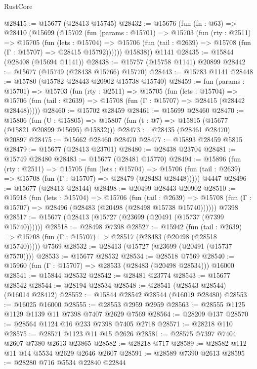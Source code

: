 \begin{lexlean}{RustCore}
\begin{coremodule}
@28415 := @15677 (@28413 @15745)
@28432 := @15676
    (fun (fn : @63) =>
    @28410
      (@15699
        (@15702
          (fun (params : @15701) =>
          @15703
            (fun (rty : @2511) =>
            @15705
              (fun (lets : @15704) =>
              @15706 (fun (tail : @2639) => @15708 (fun (Γ : @15707) => @28415 @15792))))))
        @15838))
    @1141
@28435 := @15844 (@28408 (@15694 @1141))
@28438 := @15757 (@15758 @1141) @20899
@28442 := @15677 (@15749 (@28438 @15766) @15770)
@28443 := @15783 @1141
@28448 := @15780 (@15782 @28443 @20902 @15738 @15740)
@28459 := fun (params : @15701) =>
  @15703
    (fun (rty : @2511) =>
    @15705
      (fun (lets : @15704) =>
      @15706 (fun (tail : @2639) => @15708 (fun (Γ : @15707) => @28415 (@28442 @28448)))))
@28460 := @15702 @28459
@28461 := @15699 @28460
@28470 := @15806
    (fun (U : @15805) => @15807 (fun (t : @7) => @15815 (@15677 (@15821 @20899 @15695) @15832)))
@28473 := @28435 (@28461 @28470) @20897
@28475 := @15662 @28460 @28470
@28477 := @15893 @28459 @5815
@28479 := @15677 (@28413 @23701)
@28480 := @28438 @23704
@28481 := @15749 @28480
@28483 := @15677 (@28481 @15770)
@28494 := @15896
    (fun (rty : @2511) =>
    @15705
      (fun (lets : @15704) =>
      @15706 (fun (tail : @2639) => @15708 (fun (Γ : @15707) => @28479 (@28483 @28448)))))
    @4447
@28496 := @15677 (@28413 @28144)
@28498 := @20499 @28443 @20902
@28510 := @15918
    (fun (lets : @15704) =>
    @15706
      (fun (tail : @2639) =>
      @15708 (fun (Γ : @15707) => @28496 (@28483 (@20498 (@28498 @15738 @15740))))))
    @7398
@28517 := @15677 (@28413 (@15727 (@23699 (@20491 (@15737 (@7399 @15740))))))
@28518 := @28498 @7398
@28527 := @15942
    (fun (tail : @2639) => @15708 (fun (Γ : @15707) => @28517 (@28483 (@20498 (@28518 @15740)))))
    @7569
@28532 := @28413 (@15727 (@23699 (@20491 (@15737 @7570))))
@28533 := @15677 @28532
@28534 := @28518 @7569
@28540 := @15960 (fun (Γ : @15707) => @28533 (@28483 (@20498 @28534))) @16000
@28541 := @15844 @28532
@28542 := @28481 @23774
@28543 := @15677 @28542
@28544 := @28194 @28534
@28548 := @28541 (@28543 @28544) (@16014 @28412)
@28552 := @15844 @28542 @28544 (@16019 @28480)
@28553 := @16025 @16000
@28555 := @28553 @2959 @2959
@28563 := @28555 @1125 @1129 @1139 @11 @7398 @7407 @2629 @7569
@28564 := @28209 @137
@28570 := @28564 @1124 @16 @233 @7398 @7405 @2718
@28571 := @28218 @110
@28575 := @28571 @1123 @11 @15 @2626
@28581 := @28575 @7397 @7404 @2607 @7380 @2613 @23865
@28582 := @28218 @717
@28589 := @28582 @112 @11 @14 @5534 @2629 @2646 @2607
@28591 := @28589 @7390 @2613
@28595 := @28280 @716 @5534 @22840 @22844

\end{coremodule}
\end{lexlean}
